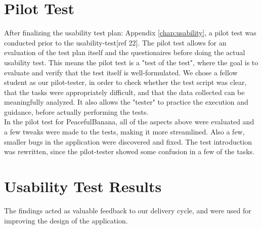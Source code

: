 \section{Pilot Test}
After finalizing the usability test plan: Appendix \ref{chap:usability}, a pilot test was conducted prior to the usability-test[ref 22]. The pilot test allows for an evaluation of the test plan itself and the questionaires before doing the actual usability test. This means the pilot test is a "test of the test", where the goal is to evaluate and verify that the test itself is well-formulated. We chose a fellow student as our pilot-tester, in order to check whether the test script was clear, that the tasks were appropriately difficult, and that the data collected can be meaningfully analyzed. 
It also allows the "tester" to practice the execution and guidance, before actually performing the tests. \\
In the pilot test for PeacefulBanana, all of the aspects above were evaluated and a few tweaks were made to the tests, making it more streamlined. Also a few, smaller bugs in the application were discovered and fixed. The test introduction was rewritten, since the pilot-tester showed some confusion in a few of the tasks. 

\section{Usability Test Results}
The findings acted as valuable feedback to our delivery cycle, and were used for improving the design of the application. 

